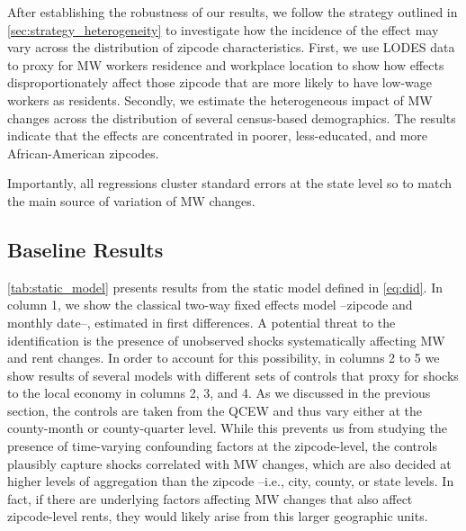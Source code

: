 
After establishing the robustness of our results, we follow the strategy outlined in 
\autoref{sec:strategy_heterogeneity} to investigate how the incidence of the effect may vary 
across the distribution of zipcode characteristics. First, we use LODES data to proxy for MW 
workers residence and workplace location to show how effects disproportionately affect those 
zipcode that are more likely to have low-wage workers as residents. Secondly, we estimate the 
heterogeneous impact of MW changes across the distribution of several census-based 
demographics. The results indicate that the effects are concentrated in poorer, less-educated, 
and more African-American zipcodes. 

Importantly, all regressions cluster standard errors at the state level so to match the main 
source of variation of MW changes.

\subsection{Baseline Results}\label{sec:baseline_results}

\autoref{tab:static_model} presents results from the static model defined in \autoref{eq:did}. In 
column 1, we show the classical two-way fixed effects model --zipcode and monthly date--, 
estimated in first differences. A potential threat to the identification is the presence of 
unobserved shocks systematically affecting MW and rent changes. In order to account for this 
possibility, in columns 2 to 5 we show results of several models with different sets of controls 
that proxy for shocks to the local economy in columns 2, 3, and 4. As we discussed in the previous 
section, the controls are taken from the QCEW and thus vary either at the county-month or 
county-quarter level. While this prevents us from studying the presence of time-varying 
confounding factors at the zipcode-level, the controls plausibly capture shocks correlated with 
MW changes, which are also decided at higher levels of aggregation than the zipcode --i.e., city, 
county, or state levels. In fact, if there are underlying factors affecting MW changes that also 
affect zipcode-level rents, they would likely arise from this larger geographic units. 

